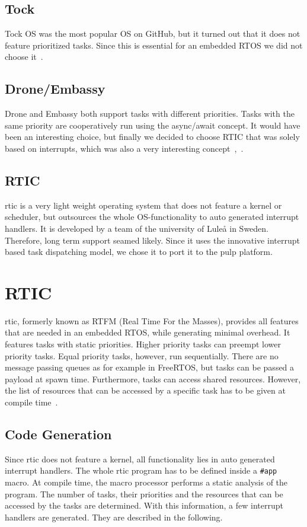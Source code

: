 \subsection{Tock}
Tock OS was the most popular OS on GitHub, but it turned out that it does not feature prioritized tasks. Since this is essential for an embedded RTOS we did not choose it~\cite{Tock}.

\subsection{Drone/Embassy}
Drone and Embassy both support tasks with different priorities. Tasks with the same priority are cooperatively run using the async/await concept. It would have been an interesting choice, but finally we decided to choose RTIC that was solely based on interrupts, which was also a very interesting concept~\cite{Drone},~\cite{Embassy}.

\subsection{RTIC}
\gls{rtic} is a very light weight operating system that does not feature a kernel or scheduler, but outsources the whole OS-functionality to auto generated interrupt handlers.
It is developed by a team of the university of Luleå in Sweden.
Therefore, long term support seamed likely.
Since it uses the innovative interrupt based task dispatching model, we chose it to port it to the \gls{pulp} platform.

\section{RTIC}
\gls{rtic}, formerly known as RTFM (Real Time For the Masses), provides all features that are needed in an embedded RTOS, while generating minimal overhead.
It features tasks with static priorities. Higher priority tasks can preempt lower priority tasks. Equal priority tasks, however, run sequentially.
There are no message passing queues as for example in FreeRTOS, but tasks can be passed a payload at spawn time.
Furthermore, tasks can access shared resources. However, the list of resources that can be accessed by a specific task has to be given at compile time~\cite{RTIC}. 

\subsection{Code Generation}
Since \gls{rtic} does not feature a kernel, all functionality lies in auto generated interrupt handlers.
The whole \gls{rtic} program has to be defined inside a \texttt{\#app} macro. At compile time, the macro processor performs a static analysis of the program. The number of tasks, their priorities and the resources that can be accessed by the tasks are determined. With this information, a few interrupt handlers are generated. They are described in the following.

